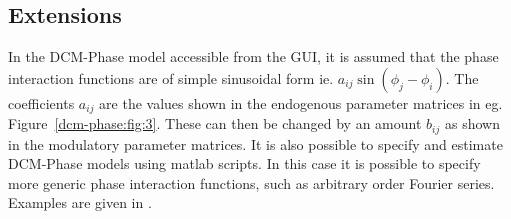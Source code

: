 \subsection{Extensions}

In the DCM-Phase model accessible from the GUI, it is assumed that the phase interaction functions are of simple sinusoidal form ie. $a_{ij} \sin(\phi_j - \phi_i)$. The coefficients $a_{ij}$ are the values shown in the endogenous 
parameter matrices in eg. Figure~\ref{dcm-phase:fig:3}. These can then be changed by an amount $b_{ij}$ as shown in the modulatory parameter matrices. 
It is also possible to specify and estimate DCM-Phase models using matlab scripts. In this case it is possible to specify more generic phase interaction functions, such as arbitrary order Fourier series. Examples are given in \cite{dcm_phase}.

